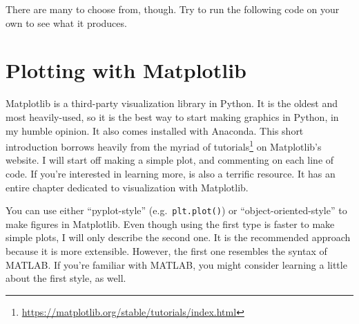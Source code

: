 \documentclass[
  12pt,
  krantz2]{krantz}
\makeatletter
\newenvironment{Shaded}{\begin{snugshade}}{\end{snugshade}}
\newcommand{\AttributeTok}[1]{\textcolor[rgb]{0.61,0.61,0.61}{#1}}
\newcommand{\DecValTok}[1]{\textcolor[rgb]{0.06,0.06,0.06}{#1}}
\newcommand{\FunctionTok}[1]{\textcolor[rgb]{0,0,0}{#1}}
\newcommand{\NormalTok}[1]{#1}
\newcommand{\OtherTok}[1]{\textcolor[rgb]{0.37,0.37,0.37}{#1}}
\newcommand{\SpecialCharTok}[1]{\textcolor[rgb]{0,0,0}{#1}}
\renewcommand{\href}[2]{#2\footnote{\url{#1}}}
\newenvironment{kframe}{%
\medskip{}
\setlength{\fboxsep}{.8em}
 \def\at@end@of@kframe{}%
 \ifinner\ifhmode%
  \def\at@end@of@kframe{\end{minipage}}%
  \begin{minipage}{\columnwidth}%
 \fi\fi%
 \def\FrameCommand##1{\hskip\@totalleftmargin \hskip-\fboxsep
 \colorbox{shadecolor}{##1}\hskip-\fboxsep
     \hskip-\linewidth \hskip-\@totalleftmargin \hskip\columnwidth}%
 \MakeFramed {\advance\hsize-\width
   \@totalleftmargin\z@ \linewidth\hsize
   \@setminipage}}%
 {\par\unskip\endMakeFramed%
 \at@end@of@kframe}
\renewenvironment{Shaded}{\begin{kframe}}{\end{kframe}}
\newenvironment{rmd-details}{\begin{lrbox}{\rmdbox}
  \minipage[c]{\dimexpr \textwidth-2\fboxrule-\wd\bulb-\columnsep}
    \vspace*{\columnsep}}%
{\vspace*{\columnsep}\endminipage\end{lrbox}%
  {\par\color{green}\fboxsep=0pt
    \fbox{\usebox\bulb\usebox\rmdbox\hspace{\columnsep}}\par}}
\makeatother
\begin{document}
There are many to choose from, though. Try to run the following code on your own to see what it produces.

\begin{Shaded}
\end{Shaded}

\hypertarget{plotting-with-matplotlib}{%
\section{Plotting with Matplotlib}\label{plotting-with-matplotlib}}

Matplotlib \citep{Hunter:2007} is a third-party visualization library in Python. It is the oldest and most heavily-used, so it is the best way to start making graphics in Python, in my humble opinion. It also comes installed with Anaconda. This short introduction borrows heavily from the myriad of \href{https://matplotlib.org/stable/tutorials/index.html}{tutorials} on Matplotlib's website. I will start off making a simple plot, and commenting on each line of code. If you're interested in learning more, \citep{py_ds_handbook} is also a terrific resource. It has an entire chapter dedicated to visualization with Matplotlib.

\begin{rmd-details}
You can use either ``pyplot-style'' (e.g.~\texttt{plt.plot()}) or ``object-oriented-style'' to make figures in Matplotlib. Even though using the first type is faster to make simple plots, I will only describe the second one. It is the recommended approach because it is more extensible. However, the first one resembles the syntax of MATLAB. If you're familiar with MATLAB, you might consider learning a little about the first style, as well.

\end{rmd-details}
\end{document}
